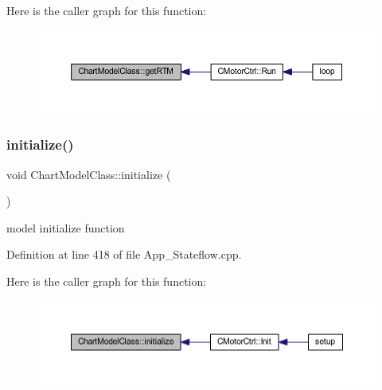 Here is the caller graph for this function\+:
\nopagebreak
\begin{figure}[H]
\begin{center}
\leavevmode
\includegraphics[width=350pt]{class_chart_model_class_a77ef9eda8f1e119f93ad3c87b3a54bbd_icgraph}
\end{center}
\end{figure}
\mbox{\label{class_chart_model_class_ab32e055f4e5692dd69685b4befbea75d}} 
\subsubsection{\texorpdfstring{initialize()}{initialize()}}
{\footnotesize\ttfamily void Chart\+Model\+Class\+::initialize (\begin{DoxyParamCaption}{ }\end{DoxyParamCaption})}



model initialize function 



Definition at line 418 of file App\+\_\+\+Stateflow.\+cpp.

Here is the caller graph for this function\+:
\nopagebreak
\begin{figure}[H]
\begin{center}
\leavevmode
\includegraphics[width=350pt]{class_chart_model_class_ab32e055f4e5692dd69685b4befbea75d_icgraph}
\end{center}
\end{figure}
\mbox{\label{class_chart_model_class_ab729e721b38bcedeed5b39c2de387413}} 
